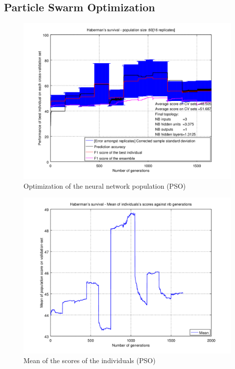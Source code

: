 \documentclass[a4paper,12pt, oneside]{memoir}
\begin{document}
\clearpage

\subsection{Particle Swarm Optimization}

\begin{figure}[h]
  \centering
  \includegraphics[scale=0.7]{haberman-performancesVSepochs-PSO}
  \vspace{-12pt}
  \caption{Optimization of the neural network population (PSO)}
  \label{haberman-perfs-PSO}
\end{figure}

\begin{figure}[h]
  \centering
  \includegraphics[scale=0.7]{haberman-meanVSepochs-PSO}
  \vspace{-12pt}
  \caption{Mean of the scores of the individuals (PSO)}
  \label{haberman-mean-PSO}
\end{figure}

\clearpage
{}

\end{document}
